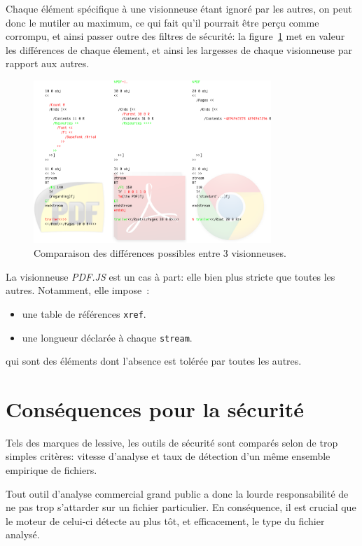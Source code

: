 Chaque élément spécifique à une visionneuse étant ignoré par les autres, on peut donc le mutiler au maximum, ce qui fait qu'il pourrait être perçu comme corrompu, et ainsi passer outre des filtres de sécurité: la figure~\ref{fig:albertini:pdf-standard} met en valeur les différences de chaque élement, et ainsi les largesses de chaque visionneuse par rapport aux autres.

\begin{figure}[ht]
  \centering
  \includegraphics[width=0.8\textwidth]{albertini/img/pdf-standard}
  \caption{Comparaison des différences possibles entre 3 visionneuses.}
  \label{fig:albertini:pdf-standard}
\end{figure}

La visionneuse {\em PDF.JS} est un cas à part: elle bien plus stricte que toutes les autres. Notamment, elle impose~:

\begin{itemize}
\item une table de références \texttt{xref}.
\item une longueur déclarée à chaque \texttt{stream}.
\end{itemize}

qui sont des éléments dont l'absence est tolérée par toutes les autres.

\section{Conséquences pour la sécurité}
Tels des marques de lessive, les outils de sécurité sont comparés selon de trop simples critères: vitesse d'analyse et taux de détection d'un même ensemble empirique de fichiers.

Tout outil d'analyse commercial grand public a donc la lourde responsabilité de ne pas trop s'attarder sur un fichier particulier. En conséquence, il est crucial que le moteur de celui-ci détecte au plus tôt, et efficacement, le type du fichier analysé.

